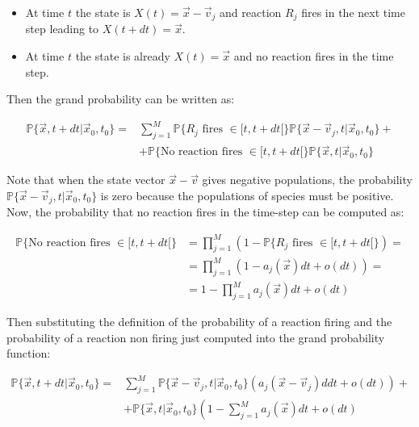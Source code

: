     \begin{multicols}{2}
      \begin{itemize}
        \item At time $t$ the state is $X(t) = \vec{x}-\vec{v}_j$ and reaction $R_j$ fires in the next time step leading to $X(t+dt) = \vec{x}$.
        \item At time $t$ the state is already $X(t)=\vec{x}$ and no reaction fires in the time step.
      \end{itemize}
    \end{multicols}

      Then the grand probability can be written as:

      \begin{align*}
        \mathbb{P}\{\vec{x}, t+dt|\vec{x}_0, t_0\} =& \sum\limits_{j=1}^M\mathbb{P}\{R_j\text{ fires }\in[t, t+dt[\}\mathbb{P}\{\vec{x}-\vec{v}_j, t|\vec{x}_0, t_0\} +\\
                                                    &+\mathbb{P}\{\text{No reaction fires }\in[t, t+dt[\}\mathbb{P}\{\vec{x}, t|\vec{x}_0, t_0\}
      \end{align*}

      Note that when the state vector $\vec{x}-\vec{v}$ gives negative populations, the probability $\mathbb{P}\{\vec{x}-\vec{v}_j, t|\vec{x}_0, t_0\}$ is zero because the populations of species must be positive.
      Now, the probability that no reaction fires in the time-step can be computed as:

      \begin{align*}
        \mathbb{P}\{\text{No reaction fires }\in[t,t+dt[\} &=\prod\limits_{j=1}^M(1-\mathbb{P}\{R_j\text{ fires }\in[t, t+dt[\}) =\\
                                                           &=\prod\limits_{j=1}^M(1-a_j(\vec{x})dt+o(dt))=\\
                                                           &=1-\prod\limits_{j=1}^M a_j(\vec{x})dt+o(dt)
      \end{align*}

      Then substituting the definition of the probability of a reaction firing and the probability of a reaction non firing just computed into the grand probability function:

      \begin{align*}
        \mathbb{P}\{\vec{x}, t+dt|\vec{x}_0, t_0\} =& \sum\limits_{j=1}^M\mathbb{P}\{\vec{x}-\vec{v}_j, t|\vec{x}_0, t_0\}(a_j(\vec{x}-\vec{v}_j)ddt + o(dt)) +\\
                                                    &+\mathbb{P}\{\vec{x}, t|\vec{x}_0, t_0\}\left(1-\sum\limits_{j=1}^Ma_j(\vec{x})dt+o(dt)
      \end{align*}

